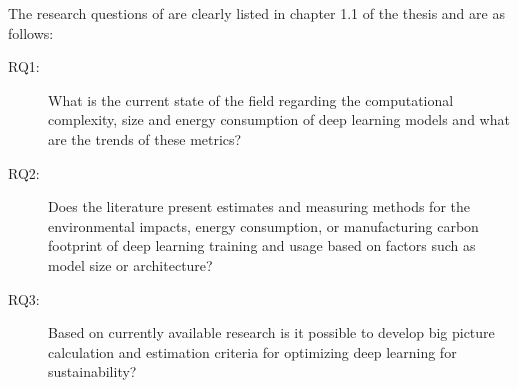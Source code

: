 \documentclass{article}
\begin{document}

	\par The research questions of \textcite{T1} are clearly listed in 
chapter 1.1 of the thesis and are as follows:

\begin{description}
	\item[RQ1:] \label{t1rq1} What is the current state of the field regarding the computational complexity, size and energy consumption of deep learning models and what are the trends of these metrics?
	\item[RQ2:] \label{t1rq2} Does the literature present estimates and measuring methods for the environmental impacts, energy consumption, or manufacturing carbon footprint of deep learning training and usage based on factors such as model size or architecture?
	\item[RQ3:] \label{t1rq3} Based on currently available research is it possible to develop big picture calculation and estimation criteria for optimizing deep learning for sustainability?
\end{description}

\end{document}
